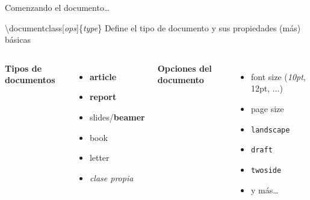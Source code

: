 \begin{frame}{Comenzando el documento\ldots}

    \begin{block}{\textbackslash documentclass[\textit{ops}]\{\textit{type}\}}
        Define el tipo de documento y sus propiedades (más) básicas
    \end{block}

    \pause

    \vspace{0.5cm}

    \begin{columns}

        \textbf{Tipos de documentos}
        \begin{itemize}
            \item \textbf{article}
            \item \textbf{report}
            \item slides/\textbf{beamer}
            \item book
            \item letter
            \item \textit{clase propia}
        \end{itemize}
        
        \pause
        
        \textbf{Opciones del documento}
        \begin{itemize}
            \item font size (\textit{10pt}, 12pt, ...)
            \item page size
            \item \texttt{landscape}
            \item \texttt{draft}
            \item \texttt{twoside}
            \item y más\ldots{}
        \end{itemize}
        
    \end{columns}
    
\end{frame}



